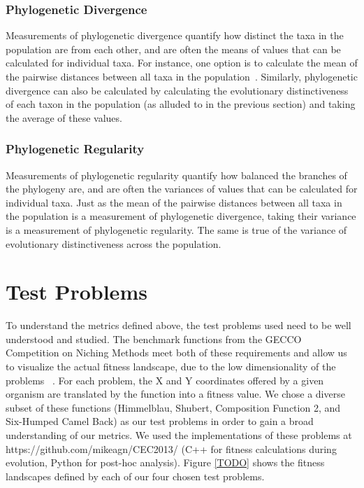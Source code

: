 \documentclass[letterpaper]{article}
\begin{document}
\subsubsection{Phylogenetic Divergence}

Measurements of phylogenetic divergence quantify how distinct the taxa in the population are from each other, and are often the means of values that can be calculated for individual taxa. For instance, one option is to calculate the mean of the pairwise distances between all taxa in the population~\citep{webb_exploring_2000}. Similarly, phylogenetic divergence can also be calculated by calculating the evolutionary distinctiveness of each taxon in the population (as alluded to in the previous section) and taking the average of these values.

\subsubsection{Phylogenetic Regularity}

Measurements of phylogenetic regularity quantify how balanced the branches of the phylogeny are, and are often the variances of values that can be calculated for individual taxa. Just as the mean of the pairwise distances between all taxa in the population is a measurement of phylogenetic divergence, taking their variance is a measurement of phylogenetic regularity. The same is true of the variance of evolutionary distinctiveness across the population.

\section{Test Problems}
To understand the metrics defined above, the test problems used need to be well understood and studied. The benchmark functions from the GECCO Competition on Niching Methods meet both of these requirements and allow us to visualize the actual fitness landscape, due to the low dimensionality of the problems ~\citep{li_benchmark_2013}. For each problem, the X and Y coordinates offered by a given organism are translated by the function into a fitness value. We chose a diverse subset of these functions (Himmelblau, Shubert, Composition Function 2, and Six-Humped Camel Back) as our test problems in order to gain a broad understanding of our metrics. We used the implementations of these problems at https://github.com/mikeagn/CEC2013/ (C++ for fitness calculations during evolution, Python for post-hoc analysis). Figure \ref{TODO} shows the fitness landscapes defined by each of our four chosen test problems. 
\end{document}
